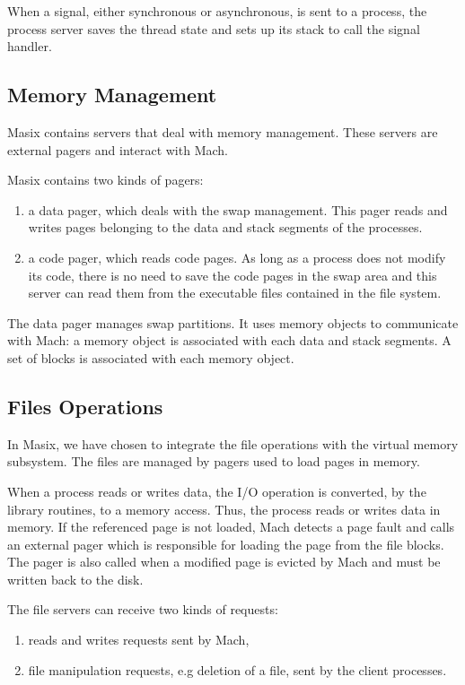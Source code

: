 	When a signal, either synchronous or asynchronous, is sent to a
process, the process server saves the thread state and sets up its stack
to call the signal handler.

\subsection {Memory Management}

	Masix contains servers that deal with memory management. These
servers are external pagers and interact with Mach.

	Masix contains two kinds of pagers:
\begin {enumerate}
\item a data pager, which deals with the swap management. This pager reads
and writes pages belonging to the data and stack segments of the processes.
\item a code pager, which reads code pages. As long as a process does not
modify its code, there is no need to save the code pages in the swap area and
this server can read them from the executable files contained in the file
system.
\end {enumerate}

	The data pager manages swap partitions. It uses memory objects to
communicate with Mach: a memory object is associated with each data and
stack segments. A set of blocks is associated with each memory object.

\subsection {Files Operations}
\label {subsection:files}

	In Masix, we have chosen to integrate the file operations with the
virtual memory subsystem. The files are managed by pagers used to
load pages in memory.

	When a process reads or writes data, the I/O operation is converted,
by the library routines, to a memory access. Thus, the process reads or
writes data in memory. If the referenced page is not loaded, Mach detects
a page fault and calls an external pager which is responsible for loading
the page from the file blocks. The pager is also called when a modified
page is evicted by Mach and must be written back to the disk.

	The file servers can receive two kinds of requests:
\begin {enumerate}
\item reads and writes requests sent by Mach,
\item file manipulation requests, e.g deletion of a file, sent by the
client processes.
\end {enumerate}

